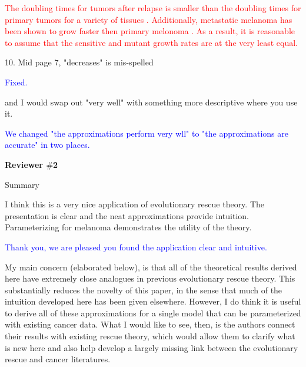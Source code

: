 \documentclass[12pt]{extarticle}
\begin{document}
\textcolor{red}{ %
The doubling times for tumors after relapse is smaller than the doubling times for primary tumors for a variety of tissues \citep{tezuka2007growth,rodgers2024glioblastoma}. Additionally, metastatic melanoma has been shown to grow faster then primary melonoma \citep{carlson2003tumor}. As a result, it is reasonable to assume that the sensitive and mutant growth rates are at the very least equal.
} 

10. Mid page 7, "decreases" is mis-spelled 

\textcolor{blue}{%
Fixed. 
} 

and I would swap out "very well" with something more descriptive where you use it.

\textcolor{blue}{
We changed "the approximations perform very wll" to "the approximations are accurate" in two places.
} 

\textbf{Reviewer $\#$2}

Summary


I think this is a very nice application of evolutionary rescue theory. The presentation is clear and the neat approximations provide intuition. Parameterizing for melanoma demonstrates the utility of the theory.

\textcolor{blue}{
Thank you, we are pleased you found the application clear and intuitive.
} 

My main concern (elaborated below), is that all of the theoretical results derived here have extremely close analogues in previous evolutionary rescue theory. This substantially reduces the novelty of this paper, in the sense that much of the intuition developed here has been given elsewhere. However, I do think it is useful to derive all of these approximations for a single model that can be parameterized with existing cancer data. What I would like to see, then, is the authors connect their results with existing rescue theory, which would allow them to clarify what is new here and also help develop a largely missing link between the evolutionary rescue and cancer literatures.
\end{document}
